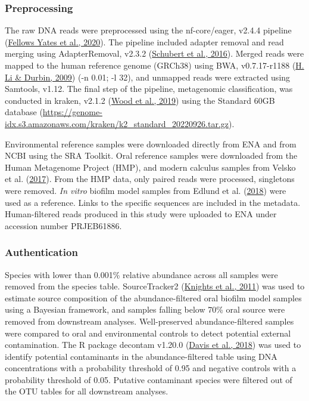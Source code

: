\documentclass[
  letterpaper,
]{book}
\begin{document}
\hypertarget{preprocessing}{%
\subsubsection{Preprocessing}\label{preprocessing}}

The raw DNA reads were preprocessed using the nf-core/eager, v2.4.4
pipeline (\protect\hyperlink{ref-yatesEAGER2020}{Fellows Yates et al.,
2020}). The pipeline included adapter removal and read merging using
AdapterRemoval, v2.3.2
(\protect\hyperlink{ref-AdapterRemovalv2}{Schubert et al., 2016}).
Merged reads were mapped to the human reference genome (GRCh38) using
BWA, v0.7.17-r1188 (\protect\hyperlink{ref-BWA}{H. Li \& Durbin, 2009})
(-n 0.01; -l 32), and unmapped reads were extracted using Samtools,
v1.12. The final step of the pipeline, metagenomic classification, was
conducted in kraken, v2.1.2 (\protect\hyperlink{ref-kraken2}{Wood et
al., 2019}) using the Standard 60GB database
(\url{https://genome-idx.s3.amazonaws.com/kraken/k2_standard_20220926.tar.gz}).

Environmental reference samples were downloaded directly from ENA and
from NCBI using the SRA Toolkit. Oral reference samples were downloaded
from the Human Metagenome Project (HMP), and modern calculus samples
from Velsko et al.
(\protect\hyperlink{ref-velskoDentalCalculus2017}{2017}). From the HMP
data, only paired reads were processed, singletons were removed.
\emph{In vitro} biofilm model samples from Edlund et al.
(\protect\hyperlink{ref-edlundUncoveringComplex2018}{2018}) were used as
a reference. Links to the specific sequences are included in the
metadata. Human-filtered reads produced in this study were uploaded to
ENA under accession number PRJEB61886.

\hypertarget{authentication}{%
\subsubsection{Authentication}\label{authentication}}

Species with lower than 0.001\% relative abundance across all samples
were removed from the species table. SourceTracker2
(\protect\hyperlink{ref-knightsSourceTracker2011}{Knights et al., 2011})
was used to estimate source composition of the abundance-filtered oral
biofilm model samples using a Bayesian framework, and samples falling
below 70\% oral source were removed from downstream analyses.
Well-preserved abundance-filtered samples were compared to oral and
environmental controls to detect potential external contamination. The R
package decontam v1.20.0 (\protect\hyperlink{ref-Rdecontam}{Davis et
al., 2018}) was used to identify potential contaminants in the
abundance-filtered table using DNA concentrations with a probability
threshold of 0.95 and negative controls with a probability threshold of
0.05. Putative contaminant species were filtered out of the OTU tables
for all downstream analyses.
\end{document}

